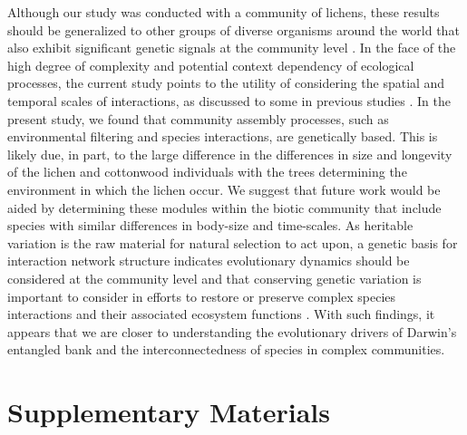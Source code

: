 \documentclass[9pt,twocolumn,twoside,lineno]{pnas-new}
\begin{document}
Although our study was conducted with a community of lichens, these
results should be generalized to other groups of diverse organisms
around the world that also exhibit significant genetic signals at the
community level \cite{Rowntree2011, Whitham2012}. In the face of the
high degree of complexity and potential context dependency of
ecological processes, the current study points to the utility of
considering the spatial and temporal scales of interactions, as
discussed to some in previous studies \cite{Bangert2006, Zook2010,
  Zytynska2012}. In the present study, we found that community
assembly processes, such as environmental filtering and species
interactions, are genetically based. This is likely due, in part, to
the large difference in the differences in size and longevity of the
lichen and cottonwood individuals with the trees determining the
environment in which the lichen occur. We suggest that future work
would be aided by determining these modules within the biotic
community that include species with similar differences in body-size
and time-scales. As heritable variation is the raw material for
natural selection to act upon, a genetic basis for interaction network
structure indicates evolutionary dynamics should be considered at the
community level and that conserving genetic variation is important to
consider in efforts to restore or preserve complex species
interactions and their associated ecosystem functions
\cite{Evans2013}.  With such findings, it appears that we are closer
to understanding the evolutionary drivers of Darwin's entangled bank
and the interconnectedness of species in complex communities.





\showacknow{} %



\newpage

\section*{Supplementary Materials}
\end{document}
